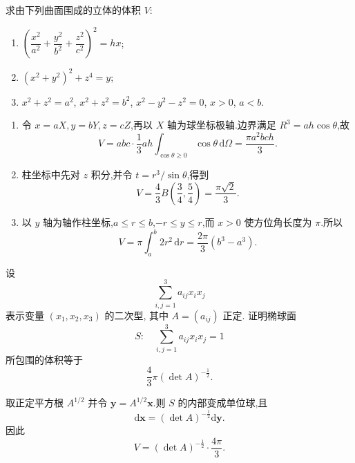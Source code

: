 \begin{example}
    求由下列曲面围成的立体的体积 $V$:
    \begin{enumerate}
        \item $\left(\dfrac{x^2}{a^2}+\dfrac{y^2}{b^2}+\dfrac{z^2}{c^2}\right)^2=hx$;
        \item $(x^2+y^2)^2+z^4=y$;
        \item $x^2+z^2=a^2$, $x^2+z^2=b^2$, $x^2-y^2-z^2=0$, $x>0$, $a<b$.
    \end{enumerate}
\end{example}
\exampleblank

\begin{solution}
    \leavevmode
    \begin{enumerate}
        \item 令 $x=aX,y=bY,z=cZ$,再以 $X$ 轴为球坐标极轴.边界满足 $R^3=ah\cos\theta$,故
              \[
                  V=abc\cdot\dfrac{1}{3}ah\int_{\cos\theta\geq0}\cos\theta\,\mathrm{d}\Omega
                  =\dfrac{\pi a^2bch}{3}.
              \]
        \item 柱坐标中先对 $z$ 积分,并令 $t=r^3/\sin\theta$,得到
              \[
                  V=\dfrac{4}{3} B\left(\dfrac{3}{4},\dfrac{5}{4}\right)=\dfrac{\pi\sqrt2}{3}.
              \]
        \item 以 $y$ 轴为轴作柱坐标,$a\leq r\leq b$,$-r\leq y\leq r$,而 $x>0$ 使方位角长度为 $\pi$.所以
              \[
                  V=\pi\int_a^b2r^2\,\mathrm{d}r=\dfrac{2\pi}{3}(b^3-a^3).
              \]
    \end{enumerate}
\end{solution}

\begin{example}[\markstar]
    设
    \[
        \displaystyle\sum\limits_{i,j=1}^3a_{ij}x_ix_j
    \]
    表示变量 $(x_1,x_2,x_3)$ 的二次型, 其中 $A=(a_{ij})$ 正定. 证明椭球面
    \[
        S:\quad\sum\limits_{i,j=1}^3a_{ij}x_ix_j=1
    \]
    所包围的体积等于
    \[
        \dfrac{4}{3}\pi(\det A)^{-\frac{1}{2}}.
    \]
\end{example}
\exampleblank

\begin{solution}
    取正定平方根 $A^{1/2}$ 并令 $\bm y=A^{1/2}\bm x$.则 $S$ 的内部变成单位球,且
    \[
        \mathrm{d}\bm x=(\det A)^{-\frac{1}{2}}\mathrm{d}\bm y.
    \]
    因此
    \[
        V=(\det A)^{-\frac{1}{2}}\cdot\dfrac{4\pi}{3}.
    \]
\end{solution}



